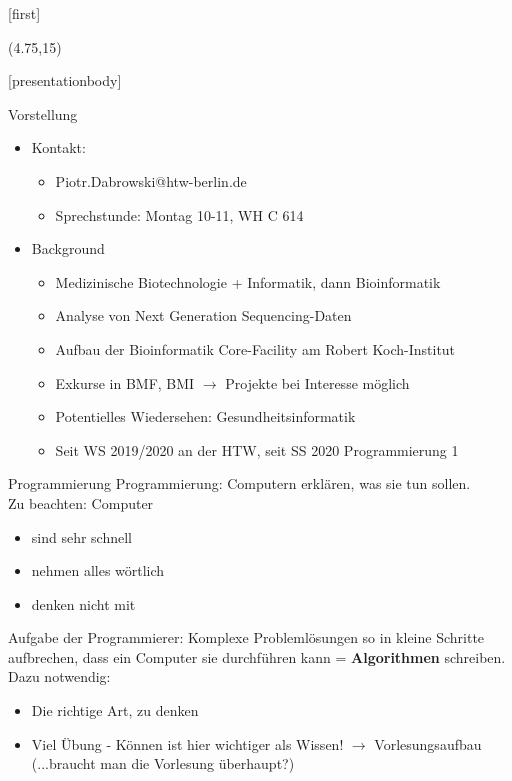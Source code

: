 \documentclass[aspectratio=169,t]{beamer}
\subtitle{1: Allgemeines}
\begin{document}
[first]

\begin{frame}[noframenumbering]
    \titlepage
    \begin{textblock}{10}(4.75,15)
        \cite{logo}
    \end{textblock}
\end{frame}

[presentationbody] 

\begin{frame}{Vorstellung}
	\begin{itemize}
		\item Kontakt:
		\begin{itemize}
			\item Piotr.Dabrowski@htw-berlin.de
			\item Sprechstunde: Montag 10-11, WH C 614
		\end{itemize}
		\item Background
		\begin{itemize}
			\item Medizinische Biotechnologie + Informatik, dann Bioinformatik
			\item Analyse von Next Generation Sequencing-Daten
			\item Aufbau der Bioinformatik Core-Facility am Robert Koch-Institut
			\item Exkurse in BMF, BMI $\rightarrow$ Projekte bei Interesse möglich
			\item Potentielles Wiedersehen: Gesundheitsinformatik
			\item Seit WS 2019/2020 an der HTW, seit SS 2020 Programmierung 1
		\end{itemize}
	\end{itemize}
\end{frame}

\begin{frame}{Programmierung}
	Programmierung: Computern erklären, was sie tun sollen. \\Zu beachten: Computer
	\begin{itemize}
		\item sind sehr schnell
		\item nehmen alles wörtlich
		\item denken nicht mit
	\end{itemize}
	Aufgabe der Programmierer: Komplexe Problemlösungen so in kleine Schritte aufbrechen, dass ein Computer sie durchführen kann = \textbf{Algorithmen} schreiben.\\
	Dazu notwendig:
	\begin{itemize}
		\item Die richtige Art, zu denken
		\item Viel Übung - Können ist hier wichtiger als Wissen! $\rightarrow$ Vorlesungsaufbau (...braucht man die Vorlesung überhaupt?)
	\end{itemize}
\end{frame}
\end{document}
